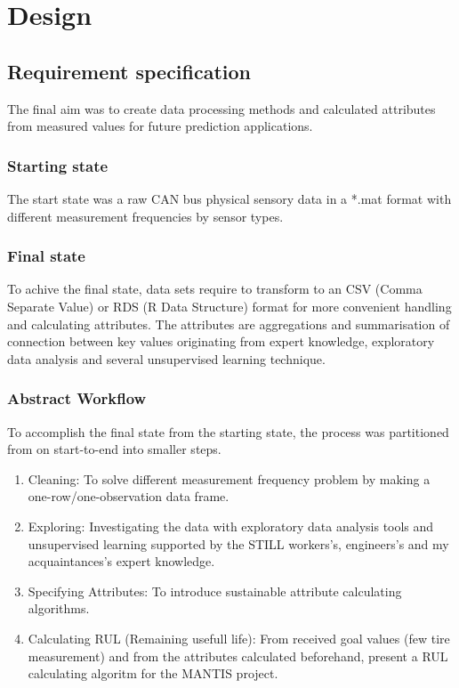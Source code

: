 \chapter{Design}
\section{Requirement specification}
	\noindent
The final aim was to create data processing methods and calculated attributes from measured values for future prediction applications.
	\subsection{Starting state}
The start state was a raw CAN bus physical sensory data in a *.mat format with different measurement frequencies by sensor types.
	\subsection{Final state}
		\noindent
To achive the final state, data sets require to transform to an CSV (Comma Separate Value) or RDS (R Data Structure) format for more convenient handling and calculating attributes.
		\noindent
The attributes are aggregations and summarisation of connection between key values originating from expert knowledge, exploratory data analysis and several unsupervised learning technique.
\subsection{Abstract Workflow}
To accomplish the final state from the starting state, the process was partitioned from on start-to-end into smaller steps. 

\begin{enumerate}
	\item {Cleaning:} To solve different measurement frequency problem by making a one-row/one-observation data frame.
	\item {Exploring:} Investigating the data with exploratory data analysis tools and unsupervised learning supported by the STILL workers's, engineers's and my acquaintances's expert knowledge.
 	\item {Specifying Attributes:} To introduce sustainable attribute calculating algorithms.
 	\item {Calculating RUL (Remaining usefull life):} From received goal values (few tire measurement) and from the attributes calculated beforehand, present a RUL calculating algoritm for the MANTIS project.
\end{enumerate}

